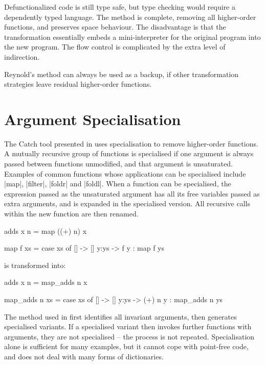 Defunctionalized code is still type safe, but type checking would require a dependently typed language. The method is complete, removing all higher-order functions, and preserves space behaviour. The disadvantage is that the transformation essentially embeds a mini-interpreter for the original program into the new program. The flow control is complicated by the extra level of indirection.

Reynold's method can always be used as a backup, if other transformation strategies leave residual higher-order functions.

\section{Argument Specialisation}

The Catch tool presented in \cite{me:catch_tfp} uses specialisation to remove higher-order functions. A mutually recursive group of functions is specialised if one argument is always passed between functions unmodified, and that argument is unsaturated. Examples of common functions whose applications can be specialised include |map|, |filter|, |foldr| and |foldl|. When a function can be specialised, the expression passed as the unsaturated argument has all its free variables passed as extra arguments, and is expanded in the specialised version. All recursive calls within the new function are then renamed.

\begin{example}
\begin{code}
adds x n = map ((+) n) x

map f xs = case  xs of
                 []    -> []
                 y:ys  -> f y : map f ys
\end{code}

\noindent is transformed into:

\begin{code}
adds x n = map_adds n x

map_adds n xs = case  xs of
                      []    -> []
                      y:ys  -> (+) n y : map_adds n ys
\end{code}
\end{example}

The method used in \cite{me:catch_tfp} first identifies all invariant arguments, then generates specialised variants. If a specialised variant then invokes further functions with arguments, they are not specialised -- the process is not repeated. Specialisation alone is sufficient for many examples, but it cannot cope with point-free code, and does not deal with many forms of dictionaries.

